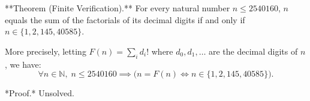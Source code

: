 
**Theorem (Finite Verification).** For every natural number $n \leq 2540160$, $n$ equals the sum of the factorials of its decimal digits if and only if $n \in \{1, 2, 145, 40585\}$.

More precisely, letting $F(n) = \sum_{i} d_i!$ where $d_0, d_1, \ldots$ are the decimal digits of $n$, we have:
$$\forall n \in \mathbb{N},\; n \leq 2540160 \implies \bigl(n = F(n) \iff n \in \{1, 2, 145, 40585\}\bigr).$$

*Proof.* Unsolved.